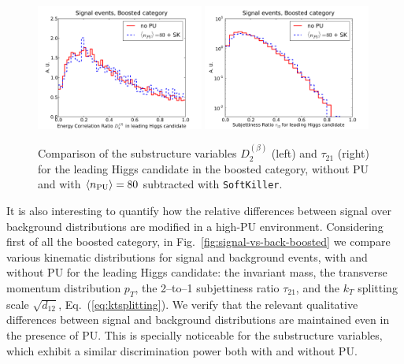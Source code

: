 \begin{figure}[t]
  \begin{center}
  \includegraphics[width=0.49\textwidth]{plots/D2_h0_bst_comp.pdf}
  \includegraphics[width=0.49\textwidth]{plots/tau21_h0_bst_comp.pdf}
   \caption{\small
     Comparison of the substructure variables $D_2^{(\beta)}$ (left)
     and $\tau_{21}$ (right)
     for the leading Higgs candidate in the boosted category,
   without PU and with $\left\langle n_{\rm PU}\right\rangle=80$ subtracted with {\tt SoftKiller}.
}
\label{fig:Substructure_PU}
\end{center}
\end{figure}

It is also interesting to quantify how
the relative differences between
signal over background distributions are modified in a high-PU
environment.
%
Considering first of all the boosted category,
in Fig.~\ref{fig:signal-vs-back-boosted} we compare
various kinematic distributions for signal and background events,
with and without PU for the leading Higgs candidate: the invariant mass, the transverse
momentum distribution $p_T$,
     the 2--to--1 subjettiness ratio $\tau_{21}$, and 
     the $k_T$ splitting scale $\sqrt{d_{12}}$, Eq.~(\ref{eq:ktsplitting}).
      We verify that the relevant
      qualitative differences between signal
      and background distributions are maintained even in the presence of PU.
      This is specially noticeable for the substructure variables, which
      exhibit a similar discrimination power both with and without
      PU.
     

